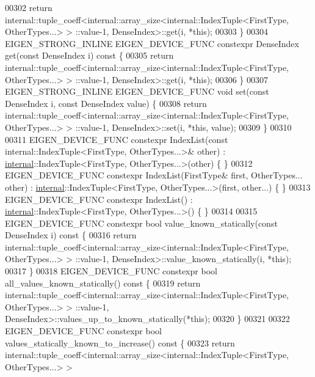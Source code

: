\begin{DoxyCode}
00302     \textcolor{keywordflow}{return} internal::tuple\_coeff<internal::array\_size<internal::IndexTuple<FirstType, OtherTypes...> >
      ::value-1, DenseIndex>::get(i, *\textcolor{keyword}{this});
00303   \}
00304   EIGEN\_STRONG\_INLINE EIGEN\_DEVICE\_FUNC constexpr DenseIndex \textcolor{keyword}{get}(\textcolor{keyword}{const} DenseIndex i) \textcolor{keyword}{const} \{
00305     \textcolor{keywordflow}{return} internal::tuple\_coeff<internal::array\_size<internal::IndexTuple<FirstType, OtherTypes...> >
      ::value-1, DenseIndex>::get(i, *\textcolor{keyword}{this});
00306   \}
00307   EIGEN\_STRONG\_INLINE EIGEN\_DEVICE\_FUNC \textcolor{keywordtype}{void} \textcolor{keyword}{set}(\textcolor{keyword}{const} DenseIndex i, \textcolor{keyword}{const} DenseIndex value) \{
00308     \textcolor{keywordflow}{return} internal::tuple\_coeff<internal::array\_size<internal::IndexTuple<FirstType, OtherTypes...> >
      ::value-1, DenseIndex>::set(i, *\textcolor{keyword}{this}, value);
00309   \}
00310 
00311   EIGEN\_DEVICE\_FUNC constexpr IndexList(\textcolor{keyword}{const} internal::IndexTuple<FirstType, OtherTypes...>& other) : 
      \hyperlink{namespaceinternal}{internal}::IndexTuple<FirstType, OtherTypes...>(other) \{ \}
00312   EIGEN\_DEVICE\_FUNC constexpr IndexList(FirstType& first, OtherTypes... other) : 
      \hyperlink{namespaceinternal}{internal}::IndexTuple<FirstType, OtherTypes...>(first, other...) \{ \}
00313   EIGEN\_DEVICE\_FUNC constexpr IndexList() : \hyperlink{namespaceinternal}{internal}::IndexTuple<FirstType, OtherTypes...>() \{ \}
00314 
00315   EIGEN\_DEVICE\_FUNC constexpr \textcolor{keywordtype}{bool} value\_known\_statically(\textcolor{keyword}{const} DenseIndex i)\textcolor{keyword}{ const }\{
00316     \textcolor{keywordflow}{return} internal::tuple\_coeff<internal::array\_size<internal::IndexTuple<FirstType, OtherTypes...> >
      ::value-1, DenseIndex>::value\_known\_statically(i, *\textcolor{keyword}{this});
00317   \}
00318   EIGEN\_DEVICE\_FUNC constexpr \textcolor{keywordtype}{bool} all\_values\_known\_statically()\textcolor{keyword}{ const }\{
00319     \textcolor{keywordflow}{return} internal::tuple\_coeff<internal::array\_size<internal::IndexTuple<FirstType, OtherTypes...> >
      ::value-1, DenseIndex>::values\_up\_to\_known\_statically(*\textcolor{keyword}{this});
00320   \}
00321 
00322   EIGEN\_DEVICE\_FUNC constexpr \textcolor{keywordtype}{bool} values\_statically\_known\_to\_increase()\textcolor{keyword}{ const }\{
00323     \textcolor{keywordflow}{return} internal::tuple\_coeff<internal::array\_size<internal::IndexTuple<FirstType, OtherTypes...> >

\end{DoxyCode}
